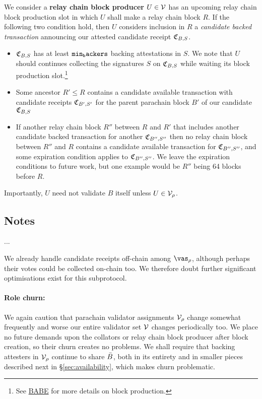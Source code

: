 \smallskip

We consider a {\bf relay chain block producer} $U \in \mathcal{V}$ has an upcoming relay chain block production slot in which $U$ shall make a relay chain block $R$.  If the following two condition hold, then $U$ considers inclusion in $R$ a {\em candidate backed transaction} announcing our attested candidate receipt $\mathfrak{C}_{B,S}$.
\begin{itemize}
%
\item $\mathfrak{C}_{B,S}$ has at least $\mathtt{min_backers}$ backing attestations in $S$.  We note that $U$ should continues collecting the signatures $S$ on $\mathfrak{C}_{B,S}$ while waiting its block production slot.\footnote{See \href{http://research.web3.foundation/en/latest/polkadot/BABE/Babe/}{BABE} for more details on block production.}
%
\item Some ancestor $R' \le R$ contains a candidate available transaction with candidate receipts $\mathfrak{C}_{B',S'}$ for the parent parachain block $B'$ of our candidate $\mathfrak{C}_{B,S}$
%
\item If another relay chain block $R''$ between $R$ and $R'$ that includes another candidate backed transaction for another $\mathfrak{C}_{B'',S''}$ then no relay chain block between $R''$ and $R$ contains a candidate available transaction for $\mathfrak{C}_{B'',S''}$, and some expiration condition applies to $\mathfrak{C}_{B'',S''}$.  
We leave the expiration conditions to future work, but one example would be $R''$ being 64 blocks before $R$.
%
\end{itemize}
Importantly, $U$ need not validate $B$ itself unless $U \in \mathcal{V}_{\rho}$.


\subsection{Notes}

...

We already handle candidate receipts off-chain among $\vas_\para$, although perhaps their votes could be collected on-chain too.  We therefore doubt further significant optimisations exist for this subprotocol.

\smallskip
\paragraph{Role churn:}

We again caution that parachain validator assignments $\mathcal{V}_{\rho}$ change somewhat frequently and worse our entire validator set $\mathcal{V}$ changes periodically too.  We place no future demands upon the collators or relay chain block producer after block creation, so their churn creates no problems.  We shall require that backing attesters in $\mathcal{V}_{\rho}$ continue to share $\bar{B}$, both in its entirety and in smaller pieces described next in \S\ref{sec:availability}, which makes churn problematic.  

